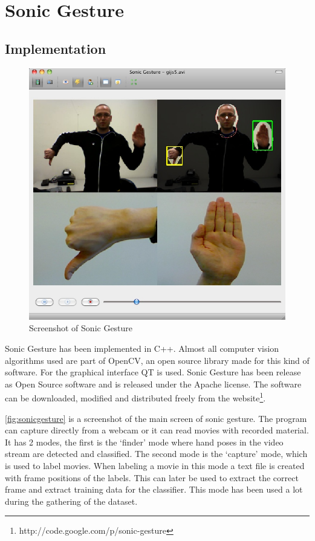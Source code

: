 
\chapter{Sonic Gesture}
\label{ch:sonicgesture}

\section{Implementation}
\label{sec:implementation}

\begin{figure}[ht]
\centering{}
\includegraphics[width=0.6\linewidth]{figures/sonicgesture.jpg}
\caption{Screenshot of Sonic Gesture}
\label{fig:sonicgesture}
\end{figure}

Sonic Gesture has been implemented in C++. Almost all computer vision algorithms used are part of OpenCV, an open source library made for this kind of software. For the graphical interface QT is used. Sonic Gesture has been release as Open Source software and is released under the Apache license. The software can be downloaded, modified and distributed freely from the website\footnote{http://code.google.com/p/sonic-gesture}.

\autoref{fig:sonicgesture} is a screenshot of the main screen of sonic gesture. The program can capture directly from a webcam or it can read movies with recorded material. It has 2 modes, the first is the `finder' mode where hand poses in the video stream are detected and classified. The second mode is the `capture' mode, which is used to label movies. When labeling a movie in this mode a text file is created with frame positions of the labels. This can later be used to extract the correct frame and extract training data for the classifier. This mode has been used a lot during the gathering of the dataset.

